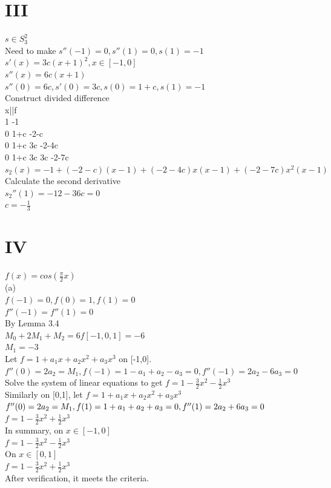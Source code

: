 \documentclass[a4paper]{article}
\begin{document}
\section*{III}
$s \in S_3^2$\\
Need to make $s''(-1)=0,s''(1)=0,s(1)=-1$\\
$s'(x)=3c(x+1)^2 ,x\in[-1,0]$\\
$s''(x)=6c(x+1)$\\
$s''(0)=6c,s'(0)=3c,s(0)=1+c,s(1)=-1$\\
Construct divided difference\\
x||f\\
1 -1\\
0 1+c -2-c\\
0 1+c 3c -2-4c\\
0 1+c 3c 3c -2-7c\\
$s_2(x)=-1+(-2-c)(x-1)+(-2-4c)x(x-1)+(-2-7c)x^2(x-1)$\\
Calculate the second derivative\\
$s_2''(1)=-12-36c=0$\\
$c=-\frac{1}{3}$\\

\section*{IV}
$f(x)=cos(\frac{\pi}{2}x)$\\
(a)\\
$f(-1)=0,f(0)=1,f(1)=0$\\
$f''(-1)=f''(1)=0$\\
By Lemma 3.4\\
$M_0+2M_1+M_2=6f[-1,0,1]=-6$\\
$M_1=-3$\\
Let $f=1+a_1x+a_2x^2+a_3x^3$ on [-1,0].\\
$f''(0)=2a_2=M_1,f(-1)=1-a_1+a_2-a_3=0,f''(-1)=2a_2-6a_3=0$\\
Solve the system of linear equations to get $f=1-\frac{3}{2}x^2-\frac{1}{2}x^3$\\
Similarly on [0,1], let $f=1+a_1x+a_2x^2+a_3x^3$\\
$f''(0)=2a_2=M_1,f(1)=1+a_1+a_2+a_3=0,\\
f''(1)=2a_2+6a_3=0$\\
$f=1-\frac{3}{2}x^2+\frac{1}{2}x^3$\\
In summary, on $x \in [-1,0]$\\
$f=1-\frac{3}{2}x^2-\frac{1}{2}x^3$\\
On $x\in [0,1]$\\
$f=1-\frac{3}{2}x^2+\frac{1}{2}x^3$\\
After verification, it meets the criteria.\\
\end{document}
